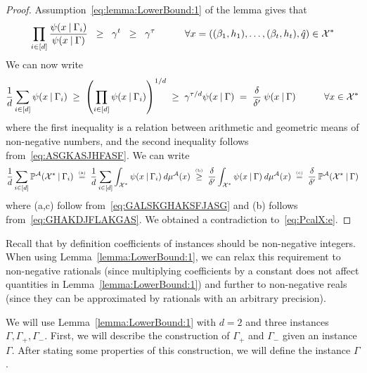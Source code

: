 \documentclass[final,12pt]{colt2018}
\def\P{{\mathbb P}}
\def\calA{{\cal A}}
\def\calX{{\cal X}}
\begin{document}
\begin{proof}
Assumption~\eqref{eq:lemma:LowerBound:1} of the lemma gives that
\begin{equation}
\prod_{i\in[d]}\frac{\psi(x\:|\:\Gamma_i)}{\psi(x\:|\:\Gamma)}\;\;\ge\;\;  \gamma^t \;\;\ge\;\;\gamma^\tau\qquad\quad\forall x=((\beta_1,h_1),\ldots,(\beta_t,h_t),\hat q)\in\calX^\ast
\label{eq:ASGKASJHFASF}
\end{equation}
We can now write
\begin{equation}
\frac{1}{d}\sum_{i\in[d]}\psi(x\:|\:\Gamma_i) 
\;\ge\;\left(\prod_{i\in[d]}\psi(x\:|\:\Gamma_i)\right)^{1/d}
\;\ge\; \gamma^{\tau/d} \psi(x\:|\:\Gamma)
\;=\; \frac{\delta}{\delta'} \:\psi(x\:|\:\Gamma)
\qquad\quad\forall x\in\calX^\ast
\label{eq:GHAKDJFLAKGAS}
\end{equation}
where the first inequality is a relation between arithmetic and geometric means of non-negative numbers,
and the second inequality follows from~\eqref{eq:ASGKASJHFASF}.
We can write
$$
\frac{1}{d}\sum_{i\in[d]}\P^\calA(\calX^\ast\:|\:\Gamma_i)
\;\stackrel{\mbox{\tiny(a)}}=\; \frac{1}{d}\sum_{i\in[d]}\int_{\calX^\ast}\psi(x\:|\:\Gamma_i)\:d\mu^\calA(x)
\;\stackrel{\mbox{\tiny(b)}}\ge\; \frac{\delta}{\delta'} \int_{\calX^\ast}\psi(x\:|\:\Gamma)\:d\mu^\calA(x)
\;\stackrel{\mbox{\tiny(c)}}=\; \frac{\delta}{\delta'}\:\P^\calA(\calX^\ast\:|\:\Gamma)
$$
where (a,c) follow from~\eqref{eq:GALSKGHAKSFJASG} and (b) follows from~\eqref{eq:GHAKDJFLAKGAS}. We obtained a contradiction to~\eqref{eq:PcalX:e}.

\end{proof}


Recall that by definition coefficients of instances should be non-negative integers.
When using Lemma~\ref{lemma:LowerBound:1}, we can relax this requirement
to non-negative rationals (since multiplying coefficients by a constant does not affect quantities in Lemma~\ref{lemma:LowerBound:1}) 
and further to non-negative reals (since they can be approximated by rationals with an arbitrary precision).

We will use Lemma~\ref{lemma:LowerBound:1} with $d=2$ and three instances $\Gamma,\Gamma_+,\Gamma_-$.
First, we will describe the construction of $\Gamma_+$ and $\Gamma_-$ given an instance $\Gamma$.
After stating some properties of this construction, we will define the instance $\Gamma$. 
\end{document}
